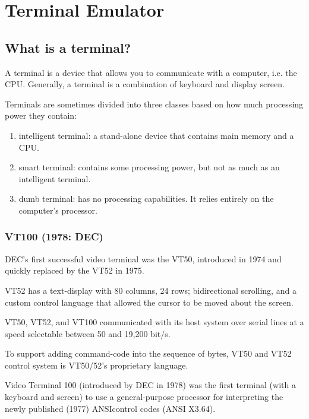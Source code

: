 \chapter{Terminal Emulator}
\label{chap:terminal-emulator}


\section{What is a terminal?}
\label{sec:terminal}

A terminal is a device that allows you to communicate with a computer, i.e. the
CPU. Generally, a terminal is a combination of keyboard and display screen. 

Terminals are sometimes divided into three classes based on how much processing
power they contain:
\begin{enumerate}
  \item  intelligent terminal: a stand-alone device that contains main memory
  and a CPU.

  \item  smart terminal: contains some processing power, but not as much as an
intelligent terminal. 
   
  \item dumb terminal: has no processing capabilities. It relies entirely on the
computer's processor. 
\end{enumerate}


\subsection{VT100 (1978: DEC)}

\begin{mdframed}

DEC's first successful video terminal was the VT50, introduced in 1974 and
quickly replaced by the VT52 in 1975.

VT52 has a text-display with 80 columns, 24 rows; bidirectional scrolling, and a
custom control language that allowed the cursor to be moved about the screen.

VT50, VT52, and VT100 communicated with its host system over serial lines at a
speed selectable between 50 and 19,200 bit/s.

To support adding command-code into the sequence of bytes, VT50 and VT52 control
system is VT50/52's proprietary language.

\end{mdframed}

Video Terminal 100 (introduced by DEC in 1978) was the first terminal (with a
keyboard and screen) to use a general-purpose processor for interpreting the
newly published (1977) ANSIcontrol codes (ANSI X3.64).

